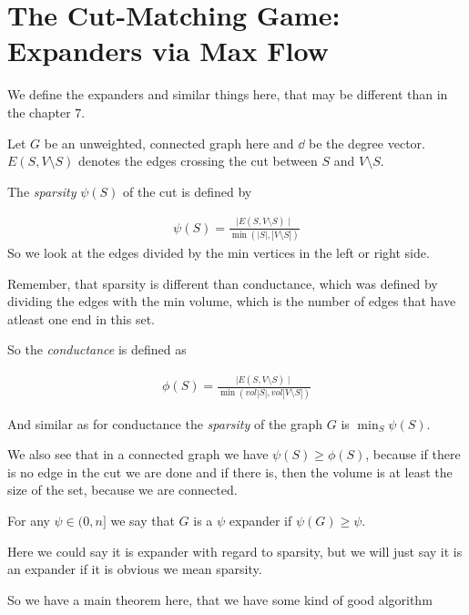 
\section{The Cut-Matching Game: Expanders via Max Flow}


We define the expanders and similar things here, that may be different than in the chapter $7$.

\begin{definicija}
    Let $G$ be an unweighted, connected graph here and $\dd$ be the degree vector. $E(S , V\setminus S)$ denotes the edges crossing the cut between $S$ and $V\setminus S$.

    The \textit{sparsity} $\psi(S)$ of the cut is defined by 

    \begin{align*}
        \psi (S) = \frac{\mid E ( S, V\setminus S) \mid}{\min ( |S|, |V \setminus S| )}
    \end{align*}
    So we look at the edges divided by the min vertices in the left or right side.

    
    Remember, that sparsity is different than conductance, which was defined by dividing the edges with the min volume, which is the number of edges that have atleast one end in this set.

    So the \textit{conductance} is defined as

    \begin{align*}
        \phi(S) = \frac{\mid E ( S, V\setminus S) \mid}{\min ( vol|S|, vol|V \setminus S| )}
    \end{align*}


    And similar as for conductance the \textit{sparsity} of the graph $G$ is $\min _S\psi (S)$.

    We also see that in a connected graph we have $\psi(S) \geq \phi(S)$, because if there is no edge in the cut  we are done and if there is, then the volume is at least the size of the set, because we are connected.

    For any $\psi \in (0, n]$ we say that $G$ is a $\psi$ expander if $\psi(G) \geq \psi$.

    Here we could say it is expander with regard to sparsity, but we will just say it is an expander if it is obvious we mean sparsity.
\end{definicija}


So we have a main theorem here, that we have some kind of good algorithm

